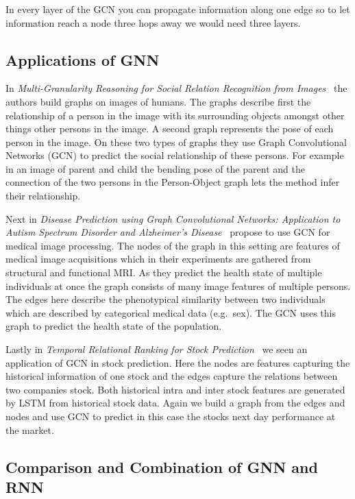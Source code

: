\documentclass{article}
\begin{document}
\subsubsection{}
In every layer of the GCN you can propagate information along one edge so to let information reach a node three hops away we would need three layers.

\subsection{Applications of GNN}\label{sub:applications_gnn}
In \textit{Multi-Granularity Reasoning for Social Relation Recognition from Images}~\cite{zhang2019} the authors build graphs on images of humans.
The graphs describe first the relationship of a person in the image with its surrounding objects amongst other things other persons in the image.
A second graph represents the pose of each person in the image.
On these two types of graphs they use Graph Convolutional Networks (GCN) to predict the social relationship of these persons.
For example in an image of parent and child the bending pose of the parent and the connection of the two persons in the Person-Object graph lets the method infer their relationship.

Next in \textit{Disease Prediction using Graph Convolutional Networks: Application to Autism Spectrum Disorder and Alzheimer's Disease}~\cite{parisot2018} propose to use GCN for medical image processing.
The nodes of the graph in this setting are features of medical image acquisitions which in their experiments are gathered from structural and functional MRI.
As they predict the health state of multiple individuals at once the graph consists of many image features of multiple persons.
The edges here describe the phenotypical similarity between two individuals which are described by categorical medical data (e.g.\ sex).
The GCN uses this graph to predict the health state of the population.


Lastly in \textit{Temporal Relational Ranking for Stock Prediction}~\cite{feng2019} we seen an application of GCN in stock prediction.
Here the nodes are features capturing the historical information of one stock and the edges capture the relations between two companies stock.
Both historical intra and inter stock features are generated by LSTM from historical stock data.
Again we build a graph from the edges and nodes and use GCN to predict in this case the stocks next day performance at the market.

\subsection{Comparison and Combination of GNN and RNN}
\end{document}
